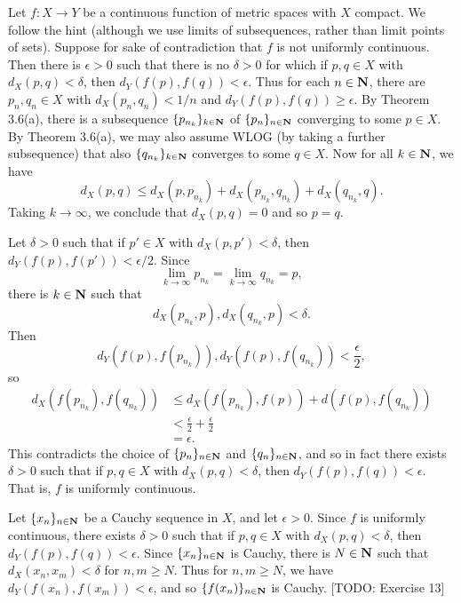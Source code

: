\begin{ex}
Let $f: X \to Y$ be a continuous function of metric spaces with $X$ compact. We follow the hint (although we use limits of subsequences, rather than limit points of sets). Suppose for sake of contradiction that $f$ is not uniformly continuous. Then there is $\epsilon > 0$ such that there is no $\delta > 0$ for which if $p, q \in X$ with $d_X(p, q) < \delta$, then $d_Y(f(p), f(q)) < \epsilon$. Thus for each $n \in \mathbf{N}$, there are $p_n, q_n \in X$ with $d_X(p_n, q_n) < 1/n$ and $d_Y(f(p), f(q)) \geq \epsilon$. By Theorem 3.6(a), there is a subsequence $\{p_{n_k}\}_{k \in \mathbf{N}}$ of $\{p_n\}_{n \in \mathbf{N}}$ converging to some $p \in X$. By Theorem 3.6(a), we may also assume WLOG (by taking a further subsequence) that also $\{q_{n_k}\}_{k \in \mathbf{N}}$ converges to some $q \in X$. Now for all $k \in \mathbf{N}$, we have \[d_X(p, q) \leq d_X(p, p_{n_k}) + d_X(p_{n_k}, q_{n_k}) + d_X(q_{n_k}, q).\] Taking $k \to \infty$, we conclude that $d_X(p, q) = 0$ and so $p = q$.

Let $\delta > 0$ such that if $p' \in X$ with $d_X(p, p') < \delta$, then $d_Y(f(p), f(p')) < \epsilon/2$. Since \[\lim_{k\to\infty}p_{n_k} = \lim_{k\to\infty}q_{n_k} = p,\] there is $k \in \mathbf{N}$ such that \[d_X(p_{n_k}, p), d_X(q_{n_k}, p) < \delta.\] Then \[d_Y(f(p), f(p_{n_k})), d_Y(f(p), f(q_{n_k})) < \frac{\epsilon}{2},\] so
\begin{align*}
d_X(f(p_{n_k}), f(q_{n_k})) & \leq d_X(f(p_{n_k}), f(p)) + d(f(p), f(q_{n_k}))\\
& < \frac{\epsilon}{2} + \frac{\epsilon}{2}\\
& = \epsilon.
\end{align*}
This contradicts the choice of $\{p_n\}_{n \in \mathbf{N}}$ and $\{q_n\}_{n \in \mathbf{N}}$, and so in fact there exists $\delta > 0$ such that if $p, q \in X$ with $d_X(p, q) < \delta$, then $d_Y(f(p), f(q)) < \epsilon$. That is, $f$ is uniformly continuous.
\end{ex}

\begin{ex}
Let $\{x_n\}_{n \in \mathbf{N}}$ be a Cauchy sequence in $X$, and let $\epsilon > 0$. Since $f$ is uniformly continuous, there exists $\delta > 0$ such that if $p, q \in X$ with $d_X(p, q) < \delta$, then $d_Y(f(p), f(q)) < \epsilon$. Since $\{x_n\}_{n \in \mathbf{N}}$ is Cauchy, there is $N \in \mathbf{N}$ such that $d_X(x_n, x_m) < \delta$ for $n, m \geq N$. Thus for $n, m \geq N$, we have $d_Y(f(x_n), f(x_m)) < \epsilon$, and so $\{f(x_n)\}_{n \in \mathbf{N}}$ is Cauchy. [TODO: Exercise 13]
\end{ex}

